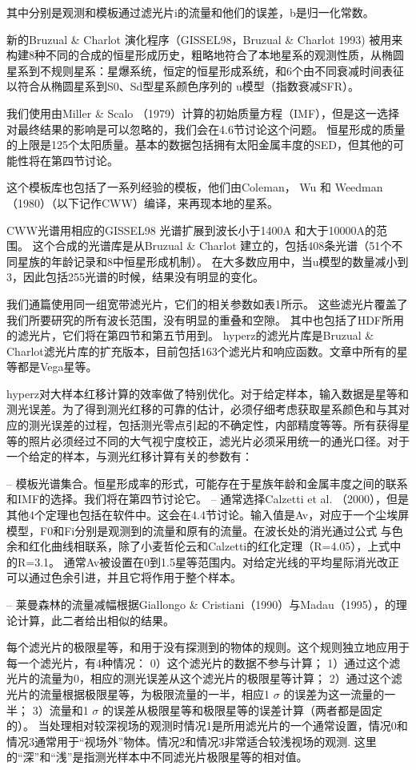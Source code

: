 其中分别是观测和模板通过滤光片i的流量和他们的误差，b是归一化常数。
 
新的Bruzual \& Charlot 演化程序（GISSEL98，Bruzual \& Charlot 1993) 被用来构建8种不同的合成的恒星形成历史，粗略地符合了本地星系的观测性质，从椭圆星系到不规则星系：星爆系统，恒定的恒星形成系统，和6个由不同衰减时间表征以符合从椭圆星系到S0、Sd型星系颜色序列的 u模型（指数衰减SFR）。
 
我们使用由Miller \& Scalo （1979）计算的初始质量方程（IMF），但是这一选择对最终结果的影响是可以忽略的，我们会在4.6节讨论这个问题。
恒星形成的质量的上限是125个太阳质量。基本的数据包括拥有太阳金属丰度的SED，但其他的可能性将在第四节讨论。
 
这个模板库也包括了一系列经验的模板，他们由Coleman， Wu 和 Weedman（1980）（以下记作CWW）编译，来再现本地的星系。
 
CWW光谱用相应的GISSEL98 光谱扩展到波长小于1400A 和大于10000A的范围。
这个合成的光谱库是从Bruzual \& Charlot 建立的，包括408条光谱（51个不同星族的年龄记录和8中恒星形成机制）。
在大多数应用中，当u模型的数量减小到3，因此包括255光谱的时候，结果没有明显的变化。
 
我们通篇使用同一组宽带滤光片，它们的相关参数如表1所示。 这些滤光片覆盖了我们所要研究的所有波长范围，没有明显的重叠和空隙。
其中也包括了HDF所用的滤光片，它们将在第四节和第五节用到。
hyperz的滤光片库是Bruzual \& Charlot滤光片库的扩充版本，目前包括163个滤光片和响应函数。文章中所有的星等都是Vega星等。
 
hyperz对大样本红移计算的效率做了特别优化。对于给定样本，输入数据是星等和测光误差。为了得到测光红移的可靠的估计，必须仔细考虑获取星系颜色和与其对应的测光误差的过程，包括测光零点引起的不确定性，内部精度等等。所有获得星等的照片必须经过不同的大气视宁度校正，滤光片必须采用统一的通光口径。对于一个给定的样本，与测光红移计算有关的参数有：
 
-- 模板光谱集合。恒星形成率的形式，可能存在于星族年龄和金属丰度之间的联系和IMF的选择。我们将在第四节讨论它。
-- 通常选择Calzetti et al. （2000），但是其他4个定理也包括在软件中。这会在4.4节讨论。输入值是Av，对应于一个尘埃屏模型，F0和Fi分别是观测到的流量和原有的流量。在波长处的消光通过公式
与色余和红化曲线相联系，除了小麦哲伦云和Calzetti的红化定理（R=4.05），上式中的R=3.1。
通常Av被设置在0到1.5星等范围内。对给定光线的平均星际消光改正可以通过色余引进，并且它将作用于整个样本。
 
-- 莱曼森林的流量减幅根据Giallongo \& Cristiani（1990）与Madau（1995），的理论计算，此二者给出相似的结果。
 
每个滤光片的极限星等，和用于没有探测到的物体的规则。这个规则独立地应用于每一个滤光片，有4种情况：
0）这个滤光片的数据不参与计算；
1）通过这个滤光片的流量为0，相应的测光误差从这个滤光片的极限星等计算；
2）通过这个滤光片的流量根据极限星等，为极限流量的一半，相应1 $\sigma $ 的误差为这一流量的一半；
3）流量和1 $\sigma $ 的误差从极限星等和极限星等的误差计算（两者都是固定的）。
当处理相对较深视场的观测时情况1是所用滤光片的一个通常设置，情况0和情况3通常用于“视场外”物体。情况2和情况3非常适合较浅视场的观测.
这里的“深”和“浅”是指测光样本中不同滤光片极限星等的相对值。
 
